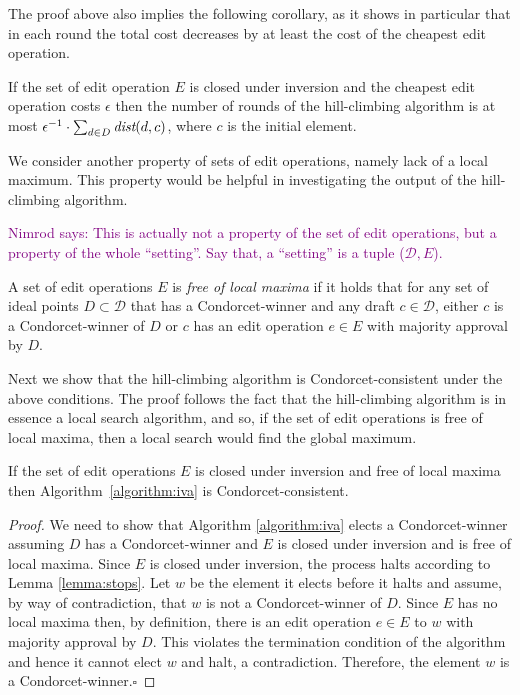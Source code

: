 \documentclass[sigconf]{aamas}  %
\newcommand{\nimrod}[1]{\textcolor{purple}{Nimrod says: #1}}
\newcommand{\qqed}{\hfill$\square$}
\newcommand{\calD}{\mathcal{D}}
\newcommand{\dist}{\emph{dist}}
\begin{document}
The proof above also implies the following corollary, as it shows in particular that in each round the total cost decreases by at least the cost of the cheapest edit operation.

\begin{corollary}
  If the set of edit operation $E$ is closed under inversion and the cheapest edit operation costs $\epsilon$ then the number of rounds of the hill-climbing algorithm is at most $\epsilon^{-1} \cdot \sum_{d \in D} \dist(d, c)$, where $c$ is the initial element. 
\end{corollary}

We consider another property of sets of edit operations, namely lack of a local maximum. This property would be helpful in investigating the output of the hill-climbing algorithm.

\nimrod{This is actually not a property of the set of edit operations, but a property of the whole ``setting''. Say that, a ``setting'' is a tuple ($\calD, E$).}

\begin{definition}
%
A set of edit operations $E$ is \emph{free of local maxima} if it holds that for any set of ideal points $D \subset \calD$ that has a Condorcet-winner and any draft $c \in \calD$, either $c$ is a Condorcet-winner of $D$ or $c$ has an edit operation $e \in E$ with majority approval by $D$.
%
\end{definition}

Next we show that the hill-climbing algorithm is Condorcet-consistent under the above conditions. The proof follows the fact that the hill-climbing algorithm is in essence a local search algorithm, and so, if the set of edit operations is free of local maxima, then a local search would find the global maximum.

\begin{lemma}\label{lemma:IIAV-epsilon-condorcet}
If the set of edit operations $E$ is closed under inversion and free of local maxima then Algorithm~\ref{algorithm:iva} is Condorcet-consistent.
\end{lemma}

\begin{proof}
%
We need to show that Algorithm \ref{algorithm:iva} elects a Condorcet-winner assuming $D$ has a Condorcet-winner and $E$ is closed under inversion and is free of local maxima.
Since $E$ is closed under inversion, the process halts according to Lemma \ref{lemma:stops}.  Let $w$ be the element it elects before it halts and assume, by way of contradiction, that $w$ is not a Condorcet-winner of $D$.  Since $E$ has no local maxima then, by definition, there is an edit operation $e \in E$ to $w$ with majority approval by $D$.  This violates the termination condition of the algorithm and hence it cannot elect $w$ and halt, a contradiction.   Therefore, the element $w$ is a Condorcet-winner.\qqed
%
\end{proof}
\end{document}
